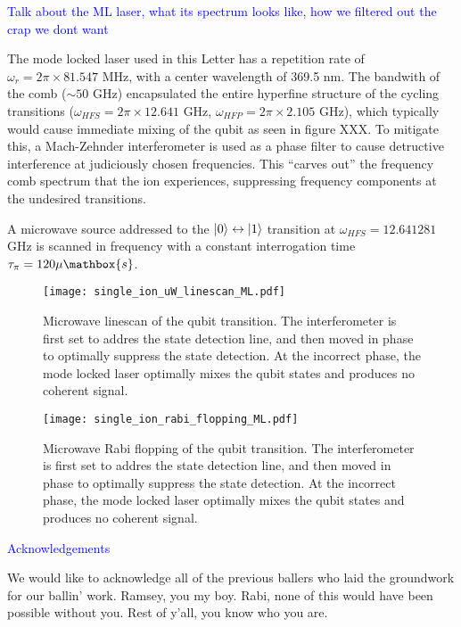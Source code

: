 \documentclass[preprint, superscriptaddress,amsmath,amssymb,aps,prl]{revtex4-1}
\newcommand{\add}[1]{\textcolor{blue}{#1}}
\begin{document}
\add{Talk about the ML laser, what its spectrum looks like, how we filtered out the crap we dont want}

The mode locked laser used in this Letter has a repetition rate of $\omega_{r} = 2\pi \times 81.547$ MHz, with a center wavelength of 369.5 nm. The bandwith of the comb ($\sim 50$ GHz) encapsulated the entire hyperfine structure of the cycling transitions ($\omega_{HFS} = 2\pi \times 12.641$ GHz, $\omega_{HFP} = 2\pi \times 2.105$ GHz), which typically would cause immediate mixing of the qubit as seen in figure XXX. To mitigate this, a Mach-Zehnder interferometer is used as a phase filter to cause detructive interference at judiciously chosen frequencies. This ``carves out'' the frequency comb spectrum that the ion experiences, suppressing frequency components at the undesired transitions.

A microwave source addressed to the $\ket{0} \leftrightarrow \ket{1}$ transition at $\omega_{HFS} = 12.641281$ GHz is scanned in frequency with a constant interrogation time $\tau_\pi = 120 \mu\mathbox{s}$. 

\begin{figure}
  \texttt{[image: single\_ion\_uW\_linescan\_ML.pdf]}
  \caption{Microwave linescan of the qubit transition. The interferometer is first set to addres the state detection line, and then moved in phase to optimally suppress the state detection. At the incorrect phase, the mode locked laser optimally mixes the qubit states and produces no coherent signal.}
\end{figure}


\begin{figure}
  \texttt{[image: single\_ion\_rabi\_flopping\_ML.pdf]}
  \caption{Microwave Rabi flopping of the qubit transition. The interferometer is first set to addres the state detection line, and then moved in phase to optimally suppress the state detection. At the incorrect phase, the mode locked laser optimally mixes the qubit states and produces no coherent signal.}
\end{figure}

\add{Acknowledgements}

\begin{acknowledgments}
  We would like to acknowledge all of the previous ballers who laid the groundwork for our ballin' work. Ramsey, you my boy. Rabi, none of this would have been possible without you. Rest of y'all, you know who you are. 
\end{acknowledgments}


\end{document}
